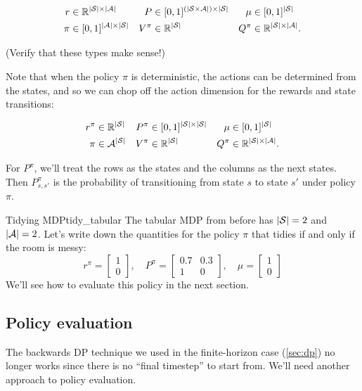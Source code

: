 \documentclass[../main/main]{subfiles}
\begin{document}
\begin{align*}
    r &\in \R^{|\S| \times |\A|} &
    P &\in [0, 1]^{(|\S \times \A|) \times |\S|} &
    \mu &\in [0, 1]^{|\S|} \\
    \pi &\in [0, 1]^{|\A| \times |\S|} &
    V^\pi &\in \R^{|\S|} &
    Q^\pi &\in \R^{|\S| \times |\A|}.
\end{align*}

(Verify that these types make sense!)

Note that when the policy $\pi$ is deterministic, the actions can be determined from the states, and so we can chop off the action dimension for the rewards and state transitions:

\begin{align*}
    r^{\pi} &\in \R^{|\S|} & P^{\pi} &\in [0, 1]^{|\S| \times |\S|} & \mu &\in [0, 1]^{|\S|} \\
    \pi &\in \A^{|\S|} & V^\pi &\in \R^{|\S|} & Q^\pi &\in \R^{|\S| \times |\A|}.
\end{align*}

For $P^\pi$, we'll treat the rows as the states and the columns as the next states. Then $P^\pi_{s, s'}$ is the probability of transitioning from state $s$ to state $s'$ under policy $\pi$.

\begin{example}{Tidying MDP}{tidy_tabular}
    The tabular MDP from before has $|\S| = 2$ and $|\A| = 2$. Let's write down the quantities for the policy $\pi$ that tidies if and only if the room is messy:
    \[
        r^{\pi} = \begin{bmatrix} 1 \\ 0 \end{bmatrix}, \quad
        P^{\pi} = \begin{bmatrix} 0.7 & 0.3 \\ 1 & 0 \end{bmatrix}, \quad
        \mu = \begin{bmatrix} 1 \\ 0 \end{bmatrix}
    \]
    We'll see how to evaluate this policy in the next section.
\end{example}

\subsection{Policy evaluation}

The backwards DP technique we used in the finite-horizon case (\ref{sec:dp}) no longer works since there is no ``final timestep'' to start from. We'll need another approach to policy evaluation.
\end{document}
